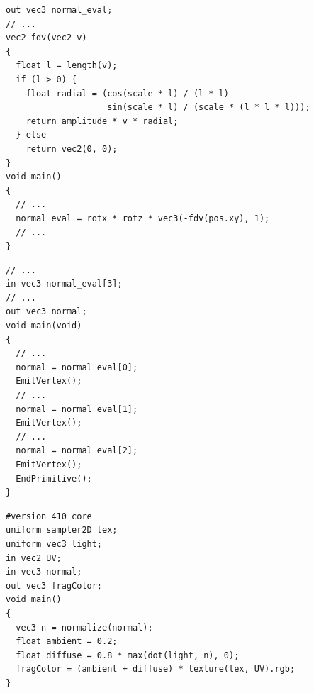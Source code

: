 \documentclass[calcdimensions,landscape,letterpaper]{powersem}
\newcommand{\thecurrentheading}{}
\newcommand{\heading}[1]{\renewcommand{\thecurrentheading}{#1}}
\begin{document}
\begin{slide}
    \heading{Diffuse Lighting: Tessellation Evaluation Shader}
    \begin{center}
        \begin{minipage}[c]{.95\textwidth}
            \begin{verbatim}
out vec3 normal_eval;
// ...
vec2 fdv(vec2 v)
{
  float l = length(v);
  if (l > 0) {
    float radial = (cos(scale * l) / (l * l) -
                    sin(scale * l) / (scale * (l * l * l)));
    return amplitude * v * radial;
  } else
    return vec2(0, 0);
}
void main()
{
  // ...
  normal_eval = rotx * rotz * vec3(-fdv(pos.xy), 1);
  // ...
}
            \end{verbatim}
        \end{minipage}
    \end{center}
\end{slide}

\begin{slide}
    \heading{Diffuse Lighting: Geometry Shader}
    \begin{center}
        \begin{minipage}[c]{.95\textwidth}
            \begin{verbatim}
// ...
in vec3 normal_eval[3];
// ...
out vec3 normal;
void main(void)
{
  // ...
  normal = normal_eval[0];
  EmitVertex();
  // ...
  normal = normal_eval[1];
  EmitVertex();
  // ...
  normal = normal_eval[2];
  EmitVertex();
  EndPrimitive();
}
            \end{verbatim}
        \end{minipage}
    \end{center}
\end{slide}

\begin{slide}
    \heading{Diffuse Lighting: Fragment Shader}
    \begin{center}
        \begin{minipage}[c]{.85\textwidth}
            \begin{verbatim}
#version 410 core
uniform sampler2D tex;
uniform vec3 light;
in vec2 UV;
in vec3 normal;
out vec3 fragColor;
void main()
{
  vec3 n = normalize(normal);
  float ambient = 0.2;
  float diffuse = 0.8 * max(dot(light, n), 0);
  fragColor = (ambient + diffuse) * texture(tex, UV).rgb;
}
            \end{verbatim}
        \end{minipage}
    \end{center}
\end{slide}
\end{document}
